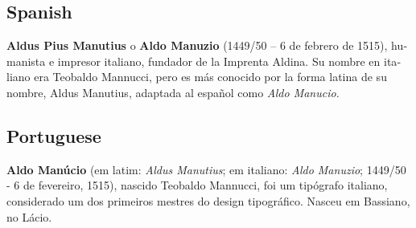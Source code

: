 \documentclass{scrartcl}
\begin{document}
\begin{multicols}{2}
\subsection{Spanish}
\begin{spanish}
\noindent\textbf{Aldus Pius Manutius} o \textbf{Aldo Manuzio} (1449/50 – 6 de febrero de 1515), humanista e impresor italiano, fundador de la Imprenta Aldina. Su nombre en italiano era {\semibold Teobaldo Mannucci,} pero es más conocido por la forma latina de su nombre, Aldus Manutius, adaptada al español como \textit{Aldo Manucio.}
\end{spanish}

\subsection{Portuguese}
\begin{portuges}
\noindent\textbf{Aldo Manúcio} (em latim: \textit{Aldus Manutius}; em italiano: \textit{Aldo Manuzio}; 1449/50 - 6 de fevereiro, 1515), nascido Teobaldo Mannucci, foi um tipógrafo italiano, considerado um dos primeiros mestres do design tipográfico. Nasceu em Bassiano, no Lácio.
\end{portuges}
\end{multicols}
\end{document}
